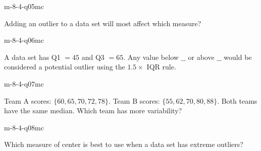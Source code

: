 \begin{practiceQuestion}{m-8-4-q05}{mc}
\begin{questionText}
Adding an outlier to a data set will most affect which measure?
\end{questionText}
\end{practiceQuestion}

\begin{practiceQuestion}{m-8-4-q06}{mc}
\begin{questionText}
A data set has Q1 $= 45$ and Q3 $= 65$. Any value below $\_\_$ or above $\_\_$ would be considered a potential outlier using the $1.5 \times$ IQR rule.
\end{questionText}
\end{practiceQuestion}

\begin{practiceQuestion}{m-8-4-q07}{mc}
\begin{questionText}
Team A scores: $\{60, 65, 70, 72, 78\}$. Team B scores: $\{55, 62, 70, 80, 88\}$. Both teams have the same median. Which team has more variability?
\end{questionText}
\end{practiceQuestion}

\begin{practiceQuestion}{m-8-4-q08}{mc}
\begin{questionText}
Which measure of center is best to use when a data set has extreme outliers?
\end{questionText}
\end{practiceQuestion}

